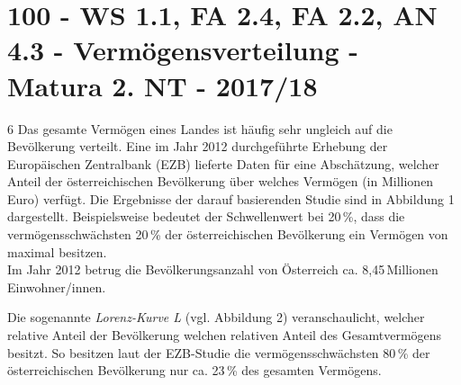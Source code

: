 \section{100 - WS 1.1, FA 2.4, FA 2.2, AN 4.3 - Vermögensverteilung - Matura 2. NT - 2017/18}

\begin{langesbeispiel} \item[6] %
Das gesamte Vermögen eines Landes ist häufig sehr ungleich auf die Bevölkerung verteilt. Eine im Jahr 2012 durchgeführte Erhebung der Europäischen Zentralbank (EZB) lieferte Daten für eine Abschätzung, welcher Anteil der österreichischen Bevölkerung über welches Vermögen (in Millionen Euro) verfügt. Die Ergebnisse der darauf basierenden Studie sind in Abbildung 1 dargestellt. Beispielsweise bedeutet der Schwellenwert bei 20\,\%, dass die vermögensschwächsten 20\,\% der österreichischen Bevölkerung ein Vermögen von maximal  besitzen.\\
Im Jahr 2012 betrug die Bevölkerungsanzahl von Österreich ca. 8,45\,Millionen Einwohner/innen.

Die sogenannte \textit{Lorenz-Kurve L} (vgl. Abbildung 2) veranschaulicht, welcher relative Anteil der Bevölkerung welchen relativen Anteil des Gesamtvermögens besitzt. So besitzen laut der EZB-Studie die vermögensschwächsten 80\,\% der österreichischen Bevölkerung nur ca. 23\,\% des gesamten Vermögens.

\end{langesbeispiel}
